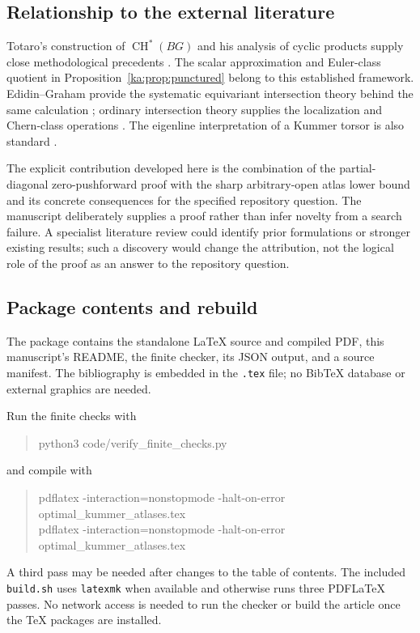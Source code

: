 \documentclass[11pt,a4paper]{article}
\theoremstyle{definition}
\theoremstyle{remark}
\newcommand{\CH}{\operatorname{CH}}
\begin{document}
\subsection{Relationship to the external literature}
Totaro's construction of $\CH^*(BG)$ and his analysis of cyclic products
supply close methodological precedents \cite{ka:Totaro}. The scalar
approximation and Euler-class quotient in
Proposition~\ref{ka:prop:punctured} belong to this established framework.
Edidin--Graham provide the systematic equivariant intersection theory
behind the same calculation \cite{ka:EdidinGraham}; ordinary intersection
theory supplies the localization and Chern-class operations
\cite{ka:Fulton}. The eigenline interpretation of a Kummer torsor is also
standard \cite{StacksKummer}.

The explicit contribution developed here is the combination of the
partial-diagonal zero-pushforward proof with the sharp arbitrary-open
atlas lower bound and its concrete consequences for the specified
repository question. The manuscript deliberately supplies a proof
rather than infer novelty from a search failure. A specialist literature
review could identify prior formulations or stronger existing results;
such a discovery would change the attribution, not the logical role of
the proof as an answer to the repository question.

\subsection{Package contents and rebuild}
The package contains the standalone LaTeX source and compiled PDF, this
manuscript's README, the finite checker, its JSON output, and a source
manifest. The bibliography is embedded in the \texttt{.tex} file; no
BibTeX database or external graphics are needed.

Run the finite checks with
\begin{quote}\ttfamily\small
python3 code/verify\_finite\_checks.py
\end{quote}
and compile with
\begin{quote}\ttfamily\small
pdflatex -interaction=nonstopmode -halt-on-error optimal\_kummer\_atlases.tex\\
pdflatex -interaction=nonstopmode -halt-on-error optimal\_kummer\_atlases.tex
\end{quote}
A third pass may be needed after changes to the table of contents. The
included \texttt{build.sh} uses \texttt{latexmk} when available and
otherwise runs three PDFLaTeX passes. No network access is needed to
run the checker or build the article once the TeX packages are installed.
\end{document}

